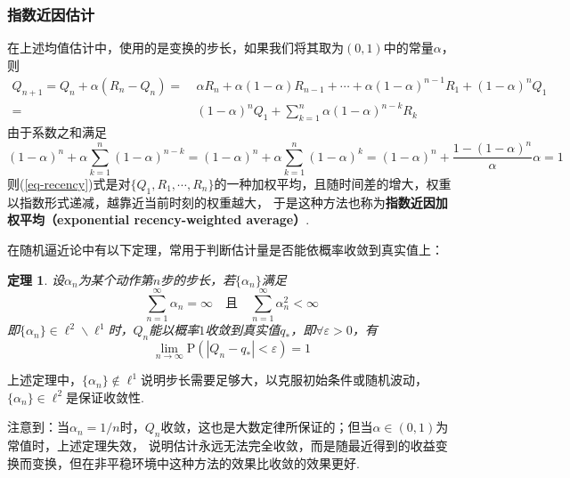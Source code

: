 \documentclass[12pt, a4paper, oneside]{ctexart}
\newtheorem{theorem}{定理}[section] %
\numberwithin{equation}{section}  %
\def\P{\mathbb{P}}          %
\def\P{\mathrm{P}}            %
\begin{document}
\subsubsection{指数近因估计}
在上述均值估计中，使用的是变换的步长，如果我们将其取为$(0,1)$中的常量$\alpha$，则
\begin{equation}\label{eq-recency}
\begin{aligned}
    Q_{n+1} = Q_n + \alpha(R_n - Q_n) =&\ \alpha R_n + \alpha(1-\alpha)R_{n-1}+\cdots+\alpha(1-\alpha)^{n-1}R_1 + (1-\alpha)^n Q_1\\
    =&\ (1-\alpha)^nQ_1 + \sum_{k=1}^n \alpha(1-\alpha)^{n-k}R_k
\end{aligned}
\end{equation}
由于系数之和满足
\begin{equation*}
    (1-\alpha)^n+\alpha\sum_{k=1}^n(1-\alpha)^{n-k} = (1-\alpha)^n + \alpha\sum_{k=1}^n(1-\alpha)^k = (1-\alpha)^n+\frac{1-(1-\alpha)^n}{\alpha}\alpha = 1
\end{equation*}
则(\ref{eq-recency})式是对$\{Q_1,R_1,\cdots,R_n\}$的一种加权平均，且随时间差的增大，权重以指数形式递减，越靠近当前时刻的权重越大，
于是这种方法也称为\textbf{指数近因加权平均（exponential recency-weighted average）}.

在随机逼近论中有以下定理，常用于判断估计量是否能依概率收敛到真实值上：
\begin{theorem}
    设$\alpha_n$为某个动作第$n$步的步长，若$\{\alpha_n\}$满足
    \begin{equation*}
        \sum_{n=1}^\infty \alpha_n = \infty\quad\text{且}\quad\sum_{n=1}^\infty \alpha_n^2<\infty
    \end{equation*}
    即$\{\alpha_n\}\in \ell^2\backslash\ell^1$时，$Q_n$能以概率$1$收敛到真实值$q_*$，即$\forall \varepsilon > 0$，有
    \begin{equation*}
        \lim_{n\to\infty}\P(|Q_n-q_*|<\varepsilon) = 1
    \end{equation*}
\end{theorem}
上述定理中，$\{\alpha_n\}\notin \ell^1$说明步长需要足够大，以克服初始条件或随机波动，$\{\alpha_n\}\in\ell^2$是保证收敛性.

注意到：当$\alpha_n=1/n$时，$Q_n$收敛，这也是大数定律所保证的；但当$\alpha\in(0,1)$为常值时，上述定理失效，
说明估计永远无法完全收敛，而是随最近得到的收益变换而变换，但在非平稳环境中这种方法的效果比收敛的效果更好.
\end{document}
